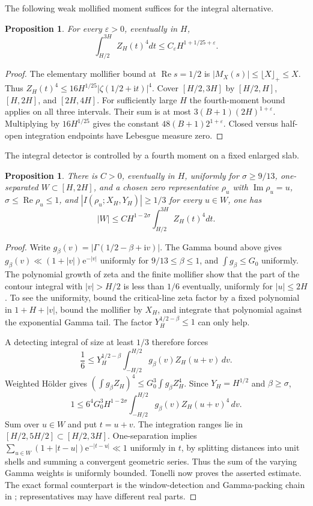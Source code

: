 \documentclass[11pt,a4paper,oneside]{article}
\newtheorem{proposition}[theorem]{Proposition}
\theoremstyle{definition}
\newcommand{\eps}{\varepsilon}
\newcommand{\ii}{\mathrm i}
\newcommand{\e}{\mathrm e}
\newcommand{\Rea}{\operatorname{Re}}
\newcommand{\Ima}{\operatorname{Im}}
\numberwithin{equation}{section}
\begin{document}
The following weak mollified moment suffices for the integral alternative.
\begin{proposition}\label{prop:weakmoment}
For every $\eps>0$, eventually in $H$,
\[
 \int_{H/2}^{3H}Z_H(t)^4dt\le C_\eps H^{1+1/25+\eps}.
\]
\end{proposition}
\begin{proof}
The elementary mollifier bound at $\Rea s=1/2$ is
$|M_X(s)|\le\lfloor X\rfloor_+\le X$. Thus
$Z_H(t)^4\le16H^{1/25}|\zeta(1/2+\ii t)|^4$.
Cover $[H/2,3H]$ by $[H/2,H]$, $[H,2H]$, and $[2H,4H]$.
For sufficiently large $H$ the fourth-moment bound applies on all
three intervals. Their sum is at most $3(B+1)(2H)^{1+\eps}$.
Multiplying by $16H^{1/25}$ gives the constant
$48(B+1)2^{1+\eps}$. Closed versus half-open integration endpoints have
Lebesgue measure zero.
\end{proof}
The integral detector is controlled by a fourth moment on a fixed enlarged slab.
\begin{proposition}\label{input:typeIIwindow}
There is $C>0$, eventually in $H$, uniformly for $\sigma\ge9/13$,
one-separated $W\subset[H,2H]$, and a chosen zero representative $\rho_u$
with $\Ima\rho_u=u$, $\sigma\le\Rea\rho_u\le1$, and $|I(\rho_u;X_H,Y_H)|\ge1/3$ for every $u\in W$, one has
\[
 |W|\le CH^{1-2\sigma}\int_{H/2}^{3H}Z_H(t)^4dt.
\]
\end{proposition}
\begin{proof}
Write $g_\beta(v)=|\Gamma(1/2-\beta+\ii v)|$. The Gamma bound above gives $g_\beta(v)\ll(1+|v|)\e^{-|v|}$ uniformly for $9/13\le\beta\le1$, and $\int g_\beta\le G_0$ uniformly. The polynomial growth of zeta and the finite mollifier show that the part of the contour integral with $|v|>H/2$ is less than $1/6$ eventually, uniformly for $|u|\le2H$. To see the uniformity, bound the critical-line zeta factor by a fixed polynomial in $1+H+|v|$, bound the mollifier by $X_H$, and integrate that polynomial against the exponential Gamma tail. The factor $Y_H^{1/2-\beta}\le1$ can only help.

A detecting integral of size at least $1/3$ therefore forces
\[
 \frac16\le Y_H^{1/2-\beta}\int_{-H/2}^{H/2}g_\beta(v)Z_H(u+v)\,dv.
\]
Weighted H\"older gives $(\int g_\beta Z_H)^4\le G_0^3\int g_\beta Z_H^4$. Since $Y_H=H^{1/2}$ and $\beta\ge\sigma$,
\[
 1\le6^4G_0^3H^{1-2\sigma}\int_{-H/2}^{H/2}g_\beta(v)Z_H(u+v)^4\,dv.
\]
Sum over $u\in W$ and put $t=u+v$. The integration ranges lie in $[H/2,5H/2]\subset[H/2,3H]$. One-separation implies $\sum_{u\in W}(1+|t-u|)\e^{-|t-u|}\ll1$ uniformly in $t$, by splitting distances into unit shells and summing a convergent geometric series. Thus the sum of the varying Gamma weights is uniformly bounded. Tonelli now proves the asserted estimate. The exact formal counterpart is the window-detection and Gamma-packing chain in \cite{Lewko}; representatives may have different real parts.
\end{proof}
\end{document}
